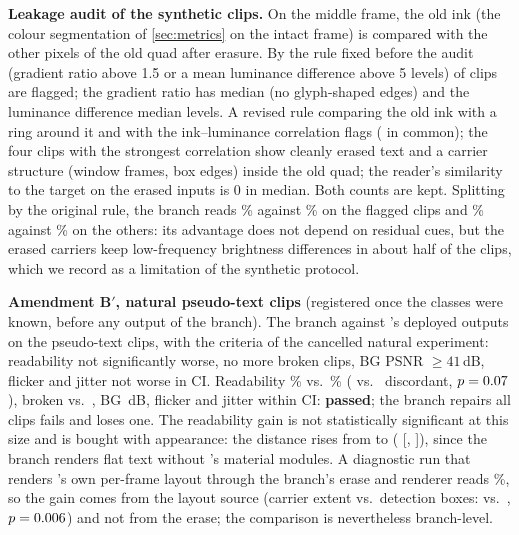 \textbf{Leakage audit of the synthetic clips.} On the middle frame, the old ink (the colour segmentation of \cref{sec:metrics} on the intact frame) is compared with the other pixels of the old quad after erasure. By the rule fixed before the audit (gradient ratio above 1.5 or a mean luminance difference above 5 levels) \lthreeAuditFlagOrig{} of \lthreeAuditN{} clips are flagged; the gradient ratio has median \lthreeAuditGradMedian{} (no glyph-shaped edges) and the luminance difference median \lthreeAuditDlumMedian{} levels. A revised rule comparing the old ink with a ring around it and with the ink--luminance correlation flags \lthreeAuditFlagRev{} (\lthreeAuditBoth{} in common); the four clips with the strongest correlation show cleanly erased text and a carrier structure (window frames, box edges) inside the old quad; the reader's similarity to the target on the erased inputs is 0 in median. Both counts are kept. Splitting by the original rule, the branch reads \lthreeAuditSuspectCar\% against \lthreeAuditSuspectBfb\% on the flagged clips and \lthreeAuditLowCar\% against \lthreeAuditLowBfb\% on the others: its advantage does not depend on residual cues, but the erased carriers keep low-frequency brightness differences in about half of the clips, which we record as a limitation of the synthetic protocol.

\textbf{Amendment B$'$, natural pseudo-text clips} (registered once the classes were known, before any output of the branch). The branch against \method's deployed outputs on the \lthreeLtwo{} pseudo-text clips, with the criteria of the cancelled natural experiment: readability not significantly worse, no more broken clips, BG PSNR $\geq 41$\,dB, flicker and jitter not worse in CI. Readability \lthreeBCarRead\% vs.\ \lthreeBBoneRead\% (\lthreeBWins{} vs.\ \lthreeBLosses{} discordant, $p=0.07$), broken \lthreeBCarBroken{} vs.\ \lthreeBBoneBroken, BG \lthreeBCarBG\,dB, flicker and jitter within CI: \textbf{passed}; the branch repairs all \lthreeBFailures{} clips \method fails and loses one. The readability gain is not statistically significant at this size and is bought with appearance: the distance rises from \lthreeBBoneMad{} to \lthreeBCarMad{} (\lthreeBMadMean{} [\lthreeBMadLo, \lthreeBMadHi]), since the branch renders flat text without \method's material modules. A diagnostic run that renders \method's own per-frame layout through the branch's erase and renderer reads \lthreeDiagOcrRead\%, so the gain comes from the layout source (carrier extent vs.\ detection boxes: \lthreeDiagWins{} vs.\ \lthreeDiagLosses, $p=0.006$) and not from the erase; the comparison is nevertheless branch-level.

